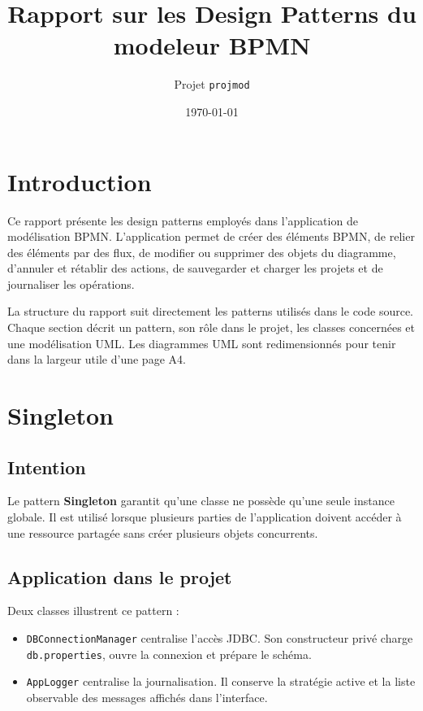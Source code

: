 \documentclass[12pt,a4paper]{article}
\title{Rapport sur les Design Patterns du modeleur BPMN}
\author{Projet \texttt{projmod}}
\date{\today}
\begin{document}
\maketitle
\tableofcontents
\newpage

\section{Introduction}

Ce rapport présente les design patterns employés dans l'application de modélisation BPMN. L'application permet de créer des éléments BPMN, de relier des éléments par des flux, de modifier ou supprimer des objets du diagramme, d'annuler et rétablir des actions, de sauvegarder et charger les projets et de journaliser les opérations.

La structure du rapport suit directement les patterns utilisés dans le code source. Chaque section décrit un pattern, son rôle dans le projet, les classes concernées et une modélisation UML. Les diagrammes UML sont redimensionnés pour tenir dans la largeur utile d'une page A4.

\section{Singleton}

\subsection{Intention}

Le pattern \textbf{Singleton} garantit qu'une classe ne possède qu'une seule instance globale. Il est utilisé lorsque plusieurs parties de l'application doivent accéder à une ressource partagée sans créer plusieurs objets concurrents.

\subsection{Application dans le projet}

Deux classes illustrent ce pattern :

\begin{itemize}
    \item \texttt{DBConnectionManager} centralise l'accès JDBC. Son constructeur privé charge \texttt{db.properties}, ouvre la connexion et prépare le schéma.
    \item \texttt{AppLogger} centralise la journalisation. Il conserve la stratégie active et la liste observable des messages affichés dans l'interface.
\end{itemize}
\end{document}
